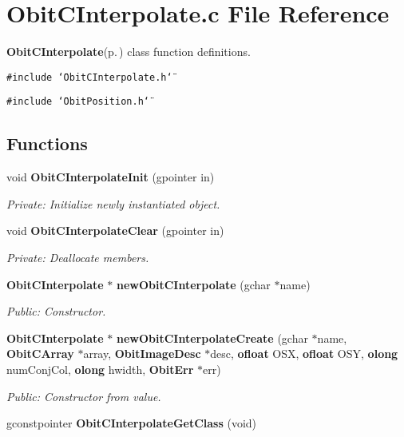 \section{Obit\-CInterpolate.c File Reference}
\label{ObitCInterpolate_8c}
{\bf Obit\-CInterpolate}{\rm (p.\,\pageref{structObitCInterpolate})} class function definitions. 

{\tt \#include \char`\"{}Obit\-CInterpolate.h\char`\"{}}\par
{\tt \#include \char`\"{}Obit\-Position.h\char`\"{}}\par
\subsection*{Functions}
\begin{CompactItemize}
\item 
void {\bf Obit\-CInterpolate\-Init} (gpointer in)
\begin{CompactList}\small\item\em Private: Initialize newly instantiated object. \item\end{CompactList}\item 
void {\bf Obit\-CInterpolate\-Clear} (gpointer in)
\begin{CompactList}\small\item\em Private: Deallocate members. \item\end{CompactList}\item 
{\bf Obit\-CInterpolate} $\ast$ {\bf new\-Obit\-CInterpolate} (gchar $\ast$name)
\begin{CompactList}\small\item\em Public: Constructor. \item\end{CompactList}\item 
{\bf Obit\-CInterpolate} $\ast$ {\bf new\-Obit\-CInterpolate\-Create} (gchar $\ast$name, {\bf Obit\-CArray} $\ast$array, {\bf Obit\-Image\-Desc} $\ast$desc, {\bf ofloat} OSX, {\bf ofloat} OSY, {\bf olong} num\-Conj\-Col, {\bf olong} hwidth, {\bf Obit\-Err} $\ast$err)
\begin{CompactList}\small\item\em Public: Constructor from value. \item\end{CompactList}\item 
gconstpointer {\bf Obit\-CInterpolate\-Get\-Class} (void)

\end{CompactItemize}
